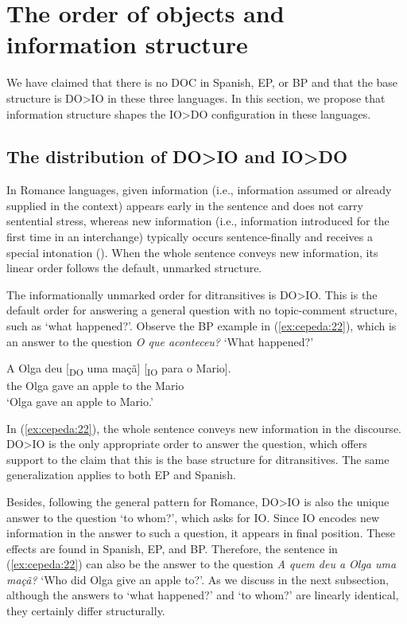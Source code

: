 \documentclass[output=paper,colorlinks,citecolor=brown,modfonts,nonflat]{langsci/langscibook}
\begin{document}
\section{The order of objects and information structure}\label{sec:cepeda:3}

We have claimed that there is no DOC in Spanish, EP, or BP and that the base structure is DO>IO in these three languages. In this section, we propose that information structure shapes the IO>DO configuration in these languages.

\subsection{The distribution of DO>IO and IO>DO}\label{sec:cepeda:3.1}

In Romance languages, given information (i.e., information assumed or already supplied in the context) appears early in the sentence and does not carry sentential stress, whereas new information (i.e., information introduced for the first time in an interchange) typically occurs sentence-finally and receives a special intonation (\citealt{Zubizarreta1998}). When the whole sentence conveys new information, its linear order follows the default, unmarked structure.

The informationally unmarked order for ditransitives is DO>IO. This is the default order for answering a general question with no topic-comment structure, such as ‘what happened?’. Observe the BP example in (\ref{ex:cepeda:22}), which is an answer to the question \textit{O que aconteceu?} ‘What happened?’

\ea%
    \label{ex:cepeda:22}
	\gll A   Olga deu [\textsubscript{DO} uma maçã] [\textsubscript{IO} para o   Mario].\\
		the Olga gave \hspaceThis{[\textsubscript{DO}} an apple \hspaceThis{[\textsubscript{IO}} to the Mario\\
	\glt ‘Olga gave an apple to Mario.’
\z

In (\ref{ex:cepeda:22}), the whole sentence conveys new information in the discourse. DO>IO is the only appropriate order to answer the question, which offers support to the claim that this is the base structure for ditransitives. The same generalization applies to both EP and Spanish.

Besides, following the general pattern for Romance, DO>IO is also the unique answer to the question ‘to whom?’, which asks for IO. Since IO encodes new information in the answer to such a question, it appears in final position. These effects are found in Spanish, EP, and BP. Therefore, the sentence in (\ref{ex:cepeda:22}) can also be the answer to the question \textit{A quem deu a Olga uma maçã?} ‘Who did Olga give an apple to?’. As we discuss in the next subsection, although the answers to ‘what happened?’ and ‘to whom?’ are linearly identical, they certainly differ structurally.
\end{document}
